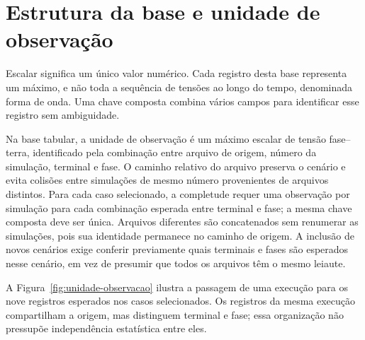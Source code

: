 \documentclass[
	12pt,				%
	openright,			%
	oneside,			%
	a4paper,			%
	chapter=TITLE,		%
	section=TITLE,		%
	subsection=TITLE,	%
	subsubsection=TITLE,%
	english,			%
	brazilian			%
	]{abntex2}
\theoremstyle{definition}
\begin{document}
\section{Estrutura da base e unidade de observação}

Escalar significa um único valor numérico. Cada registro desta base
representa um máximo, e não toda a sequência de tensões ao longo do tempo,
denominada forma de onda. Uma chave composta combina vários campos para
identificar esse registro sem ambiguidade.

Na base tabular, a unidade de observação é um máximo escalar de tensão
fase--terra, identificado pela combinação entre arquivo de origem, número da
simulação, terminal e fase. O caminho relativo do arquivo preserva o cenário e
evita colisões entre simulações de mesmo número provenientes de arquivos
distintos. Para cada caso selecionado, a completude requer uma observação por
simulação para cada combinação esperada entre terminal e fase; a mesma chave
composta deve ser única. Arquivos diferentes são concatenados sem renumerar as
simulações, pois sua identidade permanece no caminho de origem. A inclusão de
novos cenários exige conferir previamente quais terminais e fases são esperados
nesse cenário, em vez de presumir que todos os arquivos têm o mesmo leiaute.

A Figura~\ref{fig:unidade-observacao} ilustra a passagem de uma execução
para os nove registros esperados nos casos selecionados. Os registros da
mesma execução compartilham a origem, mas distinguem terminal e fase;
essa organização não pressupõe independência estatística entre eles.
\end{document}
